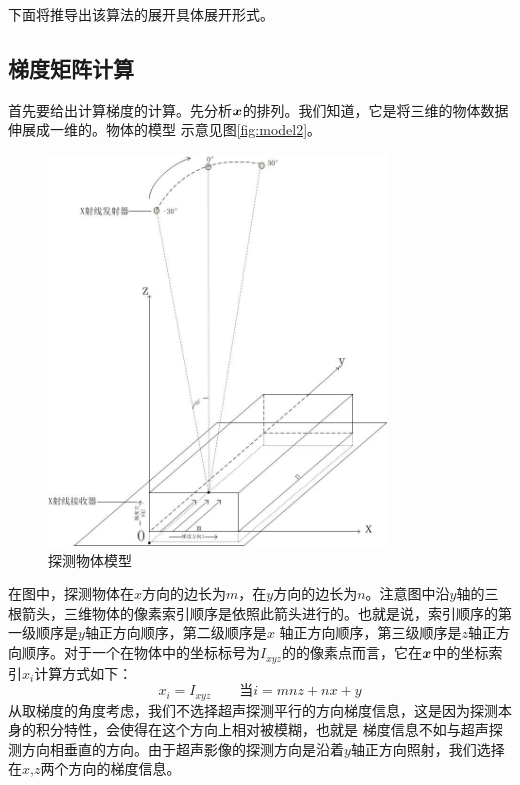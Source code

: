 下面将推导出该算法的展开具体展开形式。


\subsection{梯度矩阵计算}
首先要给出计算梯度的计算。先分析$\bm{ x}$的排列。我们知道，它是将三维的物体数据伸展成一维的。物体的模型
示意见图\ref{fig:model2}。
\begin{figure}[ht]
\center
\includegraphics[width=0.8\textwidth]{figure/model2.jpg}
\caption{探测物体模型}\label{fig:modle2}
\end{figure}
在图中，探测物体在$x$方向的边长为$m$，在$y$方向的边长为$n$。注意图中沿$y$轴的三根箭头，三维物体的像素索引顺序是依照此箭头进行的。也就是说，索引顺序的第一级顺序是$y$轴正方向顺序，第二级顺序是$x$
轴正方向顺序，第三级顺序是$z$轴正方向顺序。对于一个在物体中的坐标标号为$I_{xyz}$的的像素点而言，它在$\bm{ x}$中的坐标索引$x_i$计算方式如下：
\begin{equation}\label{eq:indexconvert}
x_i = I_{xyz}\qquad \text{当} i = mnz+nx+y
\end{equation}
从取梯度的角度考虑，我们不选择超声探测平行的方向梯度信息，这是因为探测本身的积分特性，会使得在这个方向上相对被模糊，也就是
梯度信息不如与超声探测方向相垂直的方向。由于超声影像的探测方向是沿着$y$轴正方向照射，我们选择在$x$,$z$两个方向的梯度信息。

